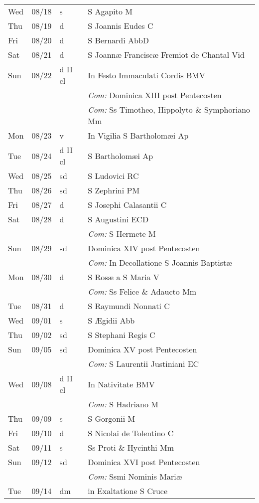 \documentclass[10pt]{article}
\begin{document}
\begin{longtable}{ l l l l }
Wed & 08/18 & s & S Agapito M\\
Thu & 08/19 & d & S Joannis Eudes C\\
Fri & 08/20 & d & S Bernardi AbbD\\
Sat & 08/21 & d & S Joannæ Franciscæ Fremiot de Chantal Vid\\
Sun & 08/22 & d II cl & In Festo Immaculati Cordis BMV\\
 & & & \textit{Com:} Dominica XIII post Pentecosten\\
 & & & \textit{Com:} Ss Timotheo, Hippolyto \& Symphoriano Mm\\
Mon & 08/23 & v & In Vigilia S Bartholomæi Ap\\
Tue & 08/24 & d II cl & S Bartholomæi Ap\\
Wed & 08/25 & sd & S Ludovici RC\\
Thu & 08/26 & sd & S Zephrini PM\\
Fri & 08/27 & d & S Josephi Calasantii C\\
Sat & 08/28 & d & S Augustini ECD\\
 & & & \textit{Com:} S Hermete M\\
Sun & 08/29 & sd & Dominica XIV post Pentecosten\\
 & & & \textit{Com:} In Decollatione S Joannis Baptistæ\\
Mon & 08/30 & d & S Rosæ a S Maria V\\
 & & & \textit{Com:} Ss Felice \& Adaucto Mm\\
Tue & 08/31 & d & S Raymundi Nonnati C\\
Wed & 09/01 & s & S Ægidii Abb\\
Thu & 09/02 & sd & S Stephani Regis C\\
Sun & 09/05 & sd & Dominica XV post Pentecosten\\
 & & & \textit{Com:} S Laurentii Justiniani EC\\
Wed & 09/08 & d II cl & In Nativitate BMV\\
 & & & \textit{Com:} S Hadriano M\\
Thu & 09/09 & s & S Gorgonii M\\
Fri & 09/10 & d & S Nicolai de Tolentino C\\
Sat & 09/11 & s & Ss Proti \& Hycinthi Mm\\
Sun & 09/12 & sd & Dominica XVI post Pentecosten\\
 & & & \textit{Com:} Ssmi Nominis Mariæ\\
Tue & 09/14 & dm & in Exaltatione S Cruce\\

\end{longtable}
\end{document}
